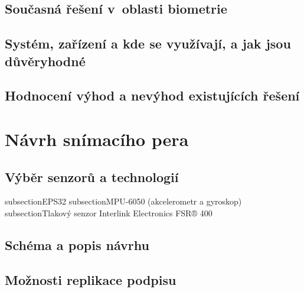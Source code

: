 \section{Současná řešení v~oblasti biometrie}
\section{Systém, zařízení a kde se využívají, a jak jsou důvěryhodné}
\section{Hodnocení výhod a nevýhod existujících řešení}

\chapter{Návrh snímacího pera}
\section{Výběr senzorů a technologií}
\*subsection{EPS32}
\*subsection{MPU-6050 (akcelerometr a gyroskop)}
\*subsection{Tlakový senzor Interlink Electronics FSR® 400}
\section{Schéma a popis návrhu}
\section{Možnosti replikace podpisu}



